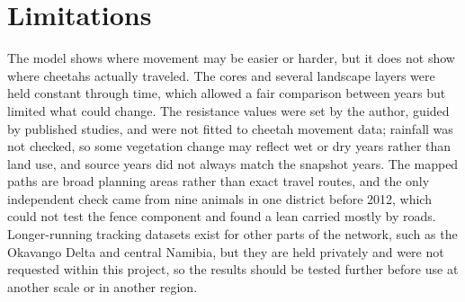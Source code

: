 \section{Limitations}
\label{sec:limitations}

The model shows where movement may be easier or harder, but it does not show where cheetahs actually traveled. The cores and several landscape layers were held constant through time, which allowed a fair comparison between years but limited what could change. The resistance values were set by the author, guided by published studies, and were not fitted to cheetah movement data; rainfall was not checked, so some vegetation change may reflect wet or dry years rather than land use, and source years did not always match the snapshot years. The mapped paths are broad planning areas rather than exact travel routes, and the only independent check came from nine animals in one district before 2012, which could not test the fence component and found a lean carried mostly by roads. Longer-running tracking datasets exist for other parts of the network, such as the Okavango Delta and central Namibia, but they are held privately and were not requested within this project, so the results should be tested further before use at another scale or in another region.
